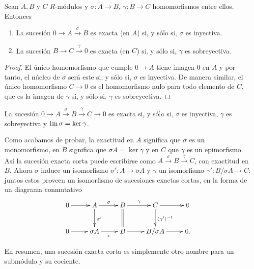 \begin{proposicion}
	Sean \(A,B\) y \(C\) \(R\)-módulos y \(\sigma: A \rightarrow B\),
	\(\gamma: B \rightarrow C\) homomorfismos entre ellos. Entonces
	\begin{enumerate}
		\item La sucesión \(0 \to A \overset{\sigma}{\to}B\) es exacta (en \(A\)) si, y
		sólo si, \(\sigma\) es inyectiva.
		
		\item La sucesión \(B \to C \overset{\gamma}{\to}0\) es exacta (en \(C\)) si, y
		sólo si, \(\gamma\) es sobreyectiva.
	\end{enumerate}
\end{proposicion}
\begin{proof}
	El único homomorfismo que cumple \(0 \to A\) tiene imagen \(0\) en \(A\) y por tanto,
	el núcleo de \(\sigma\) será este si, y sólo si, \(\sigma\) es inyectiva. De manera
	similar, el único homomorfismo \(C \to 0\) es el homomorfismo nulo para todo
	elemento de \(C\), que es la imagen de \(\gamma\) si, y sólo si, \(\gamma\) es sobreyectiva.
\end{proof}
\begin{corolario}
	La sucesión \(0 \rightarrow A \xrightarrow{\sigma}B \xrightarrow{\gamma}C \rightarrow
	0\) es exacta si, y sólo si, \(\sigma\) es inyectiva, \(\gamma\) es sobreyectiva y
	\(\operatorname{Im} \sigma = \ker \gamma\).
\end{corolario}

Como acabamos de probar, la exactitud en \(A\) significa que \(\sigma\) es un monomorfismo,
en \(B\) significa que \(\sigma A = \ker \gamma\) y en \(C\) que \(\gamma\) es un
epimorfismo. Así la sucesión exacta corta puede escribirse como \(A \xrightarrow{\sigma}
B \xrightarrow{\gamma}C\), con exactitud en \(B\). Ahora \(\sigma\) induce un isomorfismo
\(\sigma': A \to \sigma A\) y \(\gamma\) un isomorfismo \(\gamma': B/\sigma A \to C\);
juntos estos proveen un isomorfismo de sucesiones exactas cortas, en la forma de
un diagrama conmutativo
\begin{equation}
	\label{exactshortseq-equiv}\xymatrix{ 0 \ar[r] & A \ar[r]^{\sigma} \ar[d]^{\sigma'} & B \ar[r]^\gamma \ar@{=}[d] & C \ar[r] \ar[d]^{(\gamma')^{-1}} & 0 \\ 0 \ar[r] & \sigma A \ar[r]_i & B \ar[r] & B/\sigma A \ar[r] & 0. }
\end{equation}

En resumen, una sucesión exacta corta es simplemente otro nombre para un submódulo
y su cociente.

